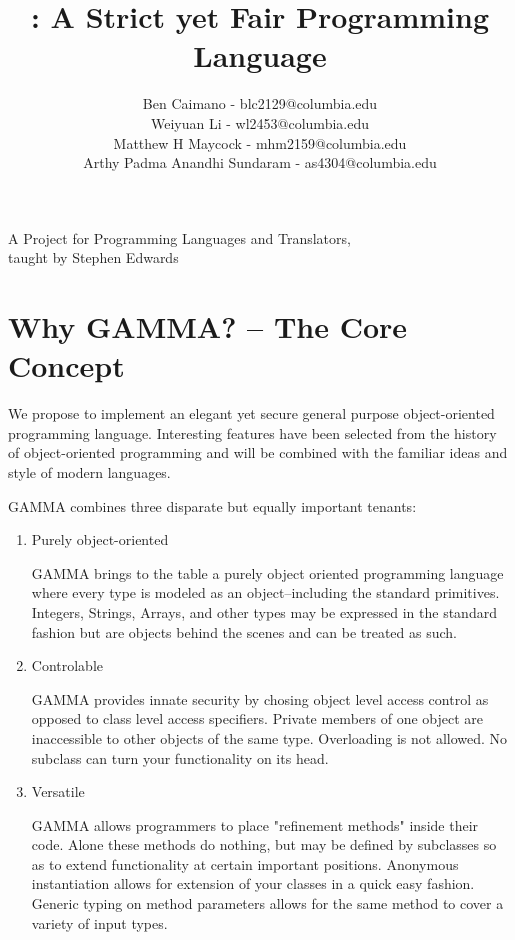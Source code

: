 \documentclass[10pt]{article}
\title{\Lang{}: A Strict yet Fair Programming Language}
\author{
	Ben Caimano - blc2129@columbia.edu \\
	Weiyuan Li - wl2453@columbia.edu \\
	Matthew H Maycock - mhm2159@columbia.edu \\
	Arthy Padma Anandhi Sundaram - as4304@columbia.edu
}
\date{}
\newcommand{\Lang}{GAMMA}
\begin{document}
\maketitle
\begin{center}
\large
A Project for Programming Languages and Translators,
\\taught by Stephen Edwards
\end{center}


\section*{Why \Lang{}? -- The Core Concept}
We propose to implement an elegant yet secure general purpose object-oriented programming language. Interesting features have been selected from the history of object-oriented programming and will be combined with the familiar ideas and style of modern languages.

\Lang{} combines three disparate but equally important tenants:


\begin{enumerate}
\item{Purely object-oriented 
    
    \Lang{} brings to the table a purely object oriented programming language where every type is
    modeled as an object--including the standard primitives. Integers, Strings, Arrays, and other types may be expressed in the standard fashion but are objects behind the scenes and can be treated as such.}

\item{Controlable

   \Lang{} provides innate security by chosing object level access
   control as opposed to class level access specifiers. Private members of one object
   are inaccessible to other objects of the same type. Overloading is not allowed. No subclass can turn your functionality on its head.}

\item{Versatile

    \Lang{} allows programmers to place "refinement methods" inside their code. Alone these methods do nothing, but may be defined by subclasses so as to extend functionality at certain important positions. Anonymous instantiation allows for extension of your classes in a quick easy fashion. Generic typing on method parameters allows for the same method to cover a variety of input types.}
\end{enumerate}
\end{document}
